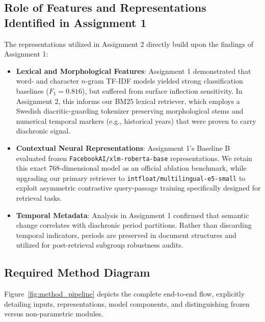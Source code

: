 \subsection{Role of Features and Representations Identified in Assignment 1}
The representations utilized in Assignment 2 directly build upon the findings of Assignment 1:
\begin{itemize}
    \item \textbf{Lexical and Morphological Features}: Assignment 1 demonstrated that word- and character $n$-gram TF-IDF models yielded strong classification baselines ($F_1 = 0.816$), but suffered from surface inflection sensitivity. In Assignment 2, this informs our BM25 lexical retriever, which employs a Swedish diacritic-guarding tokenizer preserving morphological stems and numerical temporal markers (e.g., historical years) that were proven to carry diachronic signal.
    \item \textbf{Contextual Neural Representations}: Assignment 1's Baseline B evaluated frozen \texttt{FacebookAI/xlm-roberta-base} representations. We retain this exact 768-dimensional model as an official ablation benchmark, while upgrading our primary retriever to \texttt{intfloat/multilingual-e5-small} to exploit asymmetric contrastive query-passage training specifically designed for retrieval tasks.
    \item \textbf{Temporal Metadata}: Analysis in Assignment 1 confirmed that semantic change correlates with diachronic period partitions. Rather than discarding temporal indicators, periods are preserved in document structures and utilized for post-retrieval subgroup robustness audits.
\end{itemize}

\subsection{Required Method Diagram}
Figure~\ref{fig:method_pipeline} depicts the complete end-to-end flow, explicitly detailing inputs, representations, model components, and distinguishing frozen versus non-parametric modules.

